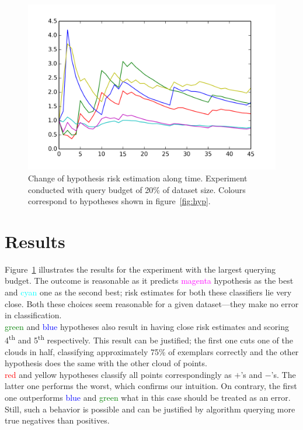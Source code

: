 \documentclass[12pt, a4paper, pdflatex, leqno, twoside]{report}
\newcommand{\ts}{\textsuperscript}
\begin{document}
\begin{figure}[htbp]
  \centering
  \includegraphics[width=0.7\linewidth]{graphics/convergence.png}
  \begin{tiny}
    \caption{Change of hypothesis risk estimation along time. Experiment 
conducted with query budget of 20\% of dataset size. Colours correspond to 
hypotheses shown in figure~\ref{fig:hyp}.\label{fig:conv}}
  \end{tiny}
  \vspace{1cm}
\end{figure}

\section{Results}
Figure~\ref{fig:conv} illustrates the results for the experiment with the largest 
querying budget. The outcome is reasonable as it predicts 
\textcolor{magenta}{magenta} hypothesis as the best and \textcolor{cyan}{cyan} 
one as the second best; risk estimates for both these classifiers lie very 
close. Both these choices seem reasonable for a given dataset---they make no 
error in classification.\\
\textcolor{green}{green} and \textcolor{blue}{blue} hypotheses also result in  
having close risk estimates and scoring 4\ts{th} and 5\ts{th} respectively. 
This result can be justified; the first one cuts one of the clouds in half, 
classifying approximately 75\% of exemplars correctly and the other hypothesis 
does the same with the other cloud of points.\\

\textcolor{red}{red} and \textcolor{Dandelion}{yellow} hypotheses classify all 
points correspondingly as $+$'s and $-$'s. The latter one performs the worst, 
which confirms our intuition. On contrary, the first one outperforms 
\textcolor{blue}{blue} and \textcolor{green}{green} what in this case should be 
treated as an error. Still, such a behavior is possible and can be justified by algorithm 
querying more true negatives than positives.\\
\end{document}
